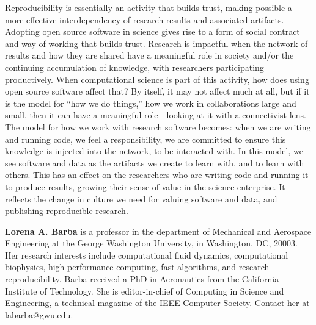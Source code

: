 \documentclass{statement}
\begin{document}
Reproducibility is essentially an activity that builds trust, making possible a more effective interdependency of research results and associated artifacts. 
Adopting open source software in science gives rise to a form of social contract and way of working that builds trust. 
Research is impactful when the network of results and how they are shared have a meaningful role in society and/or the continuing accumulation of knowledge, with researchers participating productively. 
When computational science is part of this activity, how does using open source software affect that? 
By itself, it may not affect much at all, but if it is the model for ``how we do things,'' how we work in collaborations large and small, then it can have a meaningful role---looking at it with a connectivist lens. 
The model for how we work with research software becomes: when we are writing and running code, we feel a responsibility, we are committed to ensure this knowledge is injected into the network, to be interacted with. 
In this model, we see software and data as the artifacts we create to learn with, and to learn with others. 
This has an effect on the researchers who are writing code and running it to produce results, growing their sense of value in the science enterprise. 
It reflects the change in culture we need for valuing software and data, and publishing reproducible research.



{\small


}

\bigskip 

\textbf{Lorena A. Barba} is a professor in the department of Mechanical and Aerospace Engineering at the George Washington University, in Washington, DC, 20003.
Her research interests include computational fluid dynamics, computational biophysics, high-performance computing, fast algorithms, and research reproducibility.
Barba received a PhD in Aeronautics from the California Institute of Technology.
She is editor-in-chief of Computing in Science and Engineering, a technical magazine of the IEEE Computer Society.
Contact her at labarba@gwu.edu.
\end{document}
